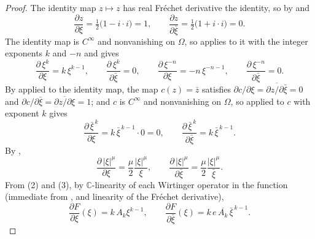 \begin{proof}
The identity map $z\mapsto z$ has real Fréchet derivative the identity, so by
 and 
\[
  \frac{\partial z}{\partial\xi}=\tfrac12\bigl(1-i\cdot i\bigr)=1,\qquad
  \frac{\partial z}{\partial\bar\xi}=\tfrac12\bigl(1+i\cdot i\bigr)=0 .
\]
The identity map is $C^\infty$ and nonvanishing on $\Omega$, so
 applies to it with the integer exponents $k$ and
$-n$ and gives
\begin{equation}\tag{2}
  \frac{\partial\,\xi^{k}}{\partial\xi}=k\,\xi^{k-1},\qquad
  \frac{\partial\,\xi^{k}}{\partial\bar\xi}=0,\qquad
  \frac{\partial\,\xi^{-n}}{\partial\xi}=-n\,\xi^{-n-1},\qquad
  \frac{\partial\,\xi^{-n}}{\partial\bar\xi}=0 .
\end{equation}
By  applied to the identity map, the map
$c(z)=\bar z$ satisfies
$\partial c/\partial\xi=\overline{\partial z/\partial\bar\xi}=0$ and
$\partial c/\partial\bar\xi=\overline{\partial z/\partial\xi}=1$; and $c$ is
$C^\infty$ and nonvanishing on $\Omega$, so 
applied to $c$ with exponent $k$ gives
\begin{equation}\tag{3}
  \frac{\partial\,\bar\xi^{\,k}}{\partial\xi}=k\,\bar\xi^{\,k-1}\cdot0=0,\qquad
  \frac{\partial\,\bar\xi^{\,k}}{\partial\bar\xi}=k\,\bar\xi^{\,k-1} .
\end{equation}
By ,
\begin{equation}\tag{4}
  \frac{\partial\,|\xi|^{\mu}}{\partial\xi}=\frac{\mu}{2}\frac{|\xi|^{\mu}}{\xi},
  \qquad
  \frac{\partial\,|\xi|^{\mu}}{\partial\bar\xi}
    =\frac{\mu}{2}\frac{|\xi|^{\mu}}{\bar\xi}.
\end{equation}
From (2) and (3), by $\mathbb{C}$-linearity of each Wirtinger operator in the
function (immediate from ,  and linearity of the
Fréchet derivative),
\begin{equation}\tag{5}
  \frac{\partial F}{\partial\xi}(\xi)=k\,A_k\xi^{k-1},\qquad
  \frac{\partial F}{\partial\bar\xi}(\xi)=k\,e\,\overline{A_k}\,\bar\xi^{\,k-1}.
\end{equation}


\end{proof}
